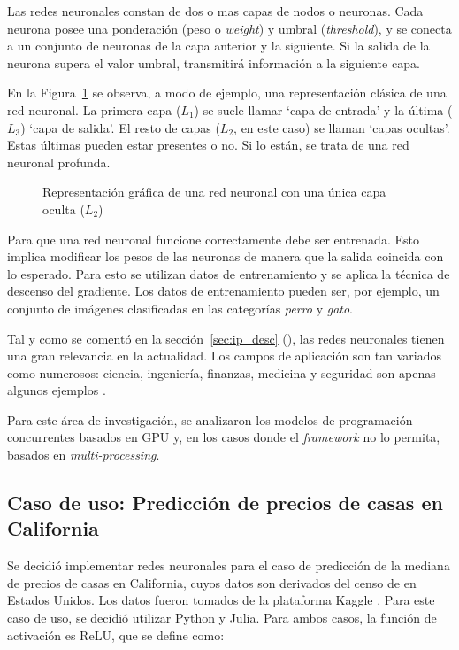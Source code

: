 \documentclass[11pt]{article}
\let\Oldsubsection\subsection
\renewcommand{\subsection}{\FloatBarrier\Oldsubsection}
\newcommand{\english}[1]{\textit{#1}}
\newcommand{\technical}[1]{\textit{#1}}
\begin{document}
Las redes neuronales constan de dos o mas capas de nodos o neuronas. Cada neurona posee una ponderación (peso o \english{weight}) y umbral (\english{threshold}), y se conecta a un conjunto de neuronas de la capa anterior y la siguiente. Si la salida de la neurona supera el valor umbral, transmitirá información a la siguiente capa.

En la Figura~\ref{fig:nn:diagram} se observa, a modo de ejemplo, una representación clásica de una red neuronal. La primera capa ($L_1$) se suele llamar `capa de entrada' y la última ($L_3$) `capa de salida'. El resto de capas ($L_2$, en este caso) se llaman `capas ocultas'. Estas últimas pueden estar presentes o no. Si lo están, se trata de una red neuronal profunda.

 \begin{figure}[h]
    \centering
    
    \caption{Representación gráfica de una red neuronal con una única capa oculta ($L_2$)}
    \label{fig:nn:diagram}
\end{figure}

Para que una red neuronal funcione correctamente debe ser entrenada. Esto implica modificar los pesos de las neuronas de manera que la salida coincida con lo esperado. Para esto se utilizan datos de entrenamiento y se aplica la técnica de descenso del gradiente. Los datos de entrenamiento pueden ser, por ejemplo, un conjunto de imágenes clasificadas en las categorías \technical{perro} y \technical{gato}.

Tal y como se comentó en la sección~\ref{sec:ip_desc} (), las redes neuronales tienen una gran relevancia en la actualidad. Los campos de aplicación son tan variados como numerosos: ciencia, ingeniería, finanzas, medicina y seguridad son apenas algunos ejemplos \cite{nn:survey}.

Para este área de investigación, se analizaron los modelos de programación concurrentes basados en GPU y, en los casos donde el \english{framework} no lo permita, basados en \english{multi-processing}. 

\subsection{Caso de uso: Predicción de precios de casas en California}

Se decidió implementar redes neuronales para el caso de predicción de la mediana de precios de casas en California, cuyos datos son derivados del censo de  en Estados Unidos. Los datos fueron tomados de la plataforma Kaggle \cite{com:kaggle}. Para este caso de uso, se decidió utilizar Python y Julia. Para ambos casos, la función de activación es ReLU, que se define como:
\end{document}
